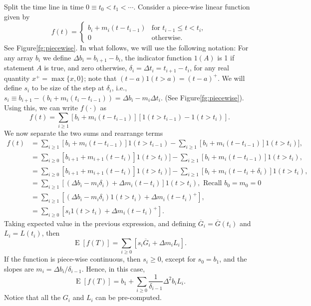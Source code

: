\documentclass[USenglish,10pt]{article}
\newcommand{\ie}{i.e.\xspace}
\newcommand{\Gb}{\overline{G}\xspace}
\DeclareMathOperator{\Exp}{E}       %
\newcommand{\E}[1]{\Exp\left[{#1}\right]}       %
\begin{document}
Split the time line in time $0\equiv t_0 < t_1 < \cdots$.
Consider a piece-wise linear function given by
\[  f(t) =
	\begin{cases}
		b_i + m_i (t - t_{i-1})   & \text{for $t_{i-1} \leq t < t_i$, } \\
		0                     & \text{otherwise}.
	\end{cases}
\]
See Figure\ref{fg:piecewise}.
In what follows, we will use the following notation:
For any array $b_i$ we define $\Delta b_i = b_{i+1} - b_i$, the indicator function $1(A)$ is 1 if statement $A$ is true, and zero otherwise, $\delta_i=\Delta t_i=t_{i+1}-t_i$, for any real quantity $x^+ = \max\{x,0\}$;
note that $(t-a)1(t>a)=(t-a)^+$.
We will define $s_i$ to be size of the step at $\delta_i$, \ie, $s_i\equiv b_{i+1}-(b_i + m_i(t_i-t_{i-1}))=\Delta b_i -m_i\Delta t_i$. (See Figure\ref{fg:piecewise}).
Using this, we can write $f(\cdot)$ as
\[    f(t) = \sum_{i \geq 1} 	[b_i + m_i (t - t_{i-1})] [1(t>t_{i-1}) - 1(t>t_i)] .\]
We now separate the two sums and rearrange terms
\begin{align*}
f(t)
&= \sum_{i \geq 1} 	[b_i + m_i (t - t_{i-1})] 1(t>t_{i-1})  - \sum_{i \geq 1} 	[b_i + m_i (t - t_{i-1})]1(t>t_i)], \\
&= \sum_{i \geq 0} 	[b_{i+1} + m_{i+1} (t - t_{i})] 1(t>t_{i})] - \sum_{i \geq 1} 	[b_i + m_i (t - t_{i-1})] 1(t>t_i),   \\
&= \sum_{i \geq 0} 	[b_{i+1} + m_{i+1} (t - t_{i})] 1(t>t_{i})] - \sum_{i \geq 1} 	[b_i + m_i (t  -t_i + \delta_i)] 1(t>t_i),   \\
&= \sum_{i \geq 1}  \left[(\Delta b_i - m_i\delta_i) + \Delta m_i (t - t_i)\right]1(t>t_i), \text { Recall $b_0=m_0=0$}\\
&= \sum_{i \geq 1} \left[(\Delta b_i - m_i\delta_i)1(t>t_i) + \Delta m_i (t - t_i)^+ \right], \\
&= \sum_{i \geq 0} \left[s_i1(t>t_i) + \Delta m_i (t - t_i)^+ \right].
\end{align*}
Taking expected value in the previous expression, and defining $\Gb_i=\Gb(t_i)$ and $L_i=L(t_i)$, then
\[  \E{f(T)} = \sum_{i \geq 0} \left[s_i\Gb_i + \Delta m_i L_i \right].  \]
If the function is piece-wise continuous, then  $s_i \geq 0$, except for $s_0=b_1$, and the slopes are $m_i=\Delta b_i/\delta_{i-1}$. Hence, in this case,
\[  \E{f(T)} = b_1 + \sum_{i \geq 0} \frac{1}{\delta_{i-1}} \Delta^2 b_i L_i.  \]
Notice that all the $G_i$ and $L_i$ can be pre-computed.
\end{document}
